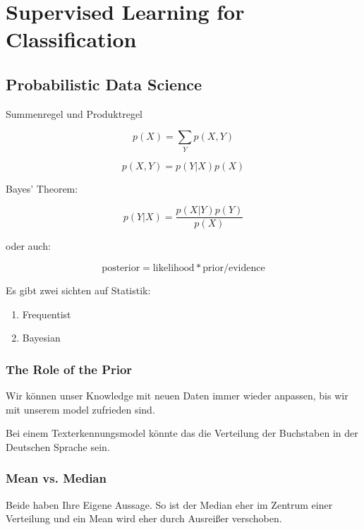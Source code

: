 \documentclass[a4paper]{article}
\title{\docTitle}
\author{Moritz}
\date{\today}
\begin{document}
\maketitle
\tableofcontents


\section{Supervised Learning for Classification}

\subsection{Probabilistic Data Science}


Summenregel und Produktregel

\[
p(X) = \sum_{Y} p(X, Y)
\]

\[
p(X, Y) = p(Y|X)p(X)
\]

Bayes' Theorem:

\[
p(Y|X) = \frac{p(X|Y)p(Y)}{p(X)}
\]

oder auch:

\[
\text{posterior} = \text{likelihood} * \text{prior} / \text{evidence}
\]

Es gibt zwei sichten auf Statistik:

\begin{enumerate}
    \item Frequentist
    \item Bayesian
\end{enumerate}

\subsubsection{The Role of the Prior}

Wir können unser Knowledge mit neuen Daten immer wieder anpassen, bis wir mit unserem model zufrieden sind.

Bei einem Texterkennungsmodel könnte das die Verteilung der Buchstaben in der Deutschen Sprache sein.

\subsubsection{Mean vs. Median}

Beide haben Ihre Eigene Aussage. So ist der Median eher im Zentrum einer Verteilung und ein Mean wird eher durch Ausreißer verschoben.
\end{document}

